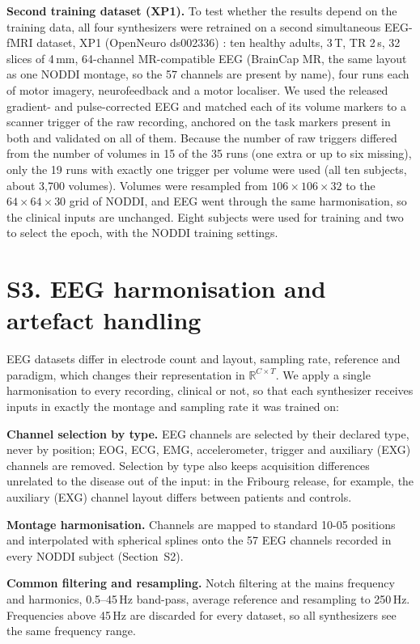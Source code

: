 \documentclass[10pt]{article}
\begin{document}
\noindent\textbf{Second training dataset (XP1).} To test whether the results depend on the training data, all four synthesizers were retrained on a second simultaneous EEG-fMRI dataset, XP1 (OpenNeuro ds002336) \cite{lioi2020xp}: ten healthy adults, 3\,T, TR 2\,s, 32 slices of 4\,mm, 64-channel MR-compatible EEG (BrainCap MR, the same layout as one NODDI montage, so the 57 channels are present by name), four runs each of motor imagery, neurofeedback and a motor localiser. We used the released gradient- and pulse-corrected EEG and matched each of its volume markers to a scanner trigger of the raw recording, anchored on the task markers present in both and validated on all of them. Because the number of raw triggers differed from the number of volumes in 15 of the 35 runs (one extra or up to six missing), only the 19 runs with exactly one trigger per volume were used (all ten subjects, about 3,700 volumes). Volumes were resampled from $106\times106\times32$ to the $64\times64\times30$ grid of NODDI, and EEG went through the same harmonisation, so the clinical inputs are unchanged. Eight subjects were used for training and two to select the epoch, with the NODDI training settings.

\section*{S3. EEG harmonisation and artefact handling}

EEG datasets differ in electrode count and layout, sampling rate, reference and paradigm, which changes their representation in $\mathbb{R}^{C \times T}$. We apply a single harmonisation to every recording, clinical or not, so that each synthesizer receives inputs in exactly the montage and sampling rate it was trained on:

\noindent\textbf{Channel selection by type.} EEG channels are selected by their declared type, never by position; EOG, ECG, EMG, accelerometer, trigger and auxiliary (EXG) channels are removed. Selection by type also keeps acquisition differences unrelated to the disease out of the input: in the Fribourg release, for example, the auxiliary (EXG) channel layout differs between patients and controls.

\noindent\textbf{Montage harmonisation.} Channels are mapped to standard 10-05 positions and interpolated with spherical splines onto the 57 EEG channels recorded in every NODDI subject (Section~S2).

\noindent\textbf{Common filtering and resampling.} Notch filtering at the mains frequency and harmonics, 0.5--45\,Hz band-pass, average reference and resampling to 250\,Hz. Frequencies above 45\,Hz are discarded for every dataset, so all synthesizers see the same frequency range.
\end{document}

